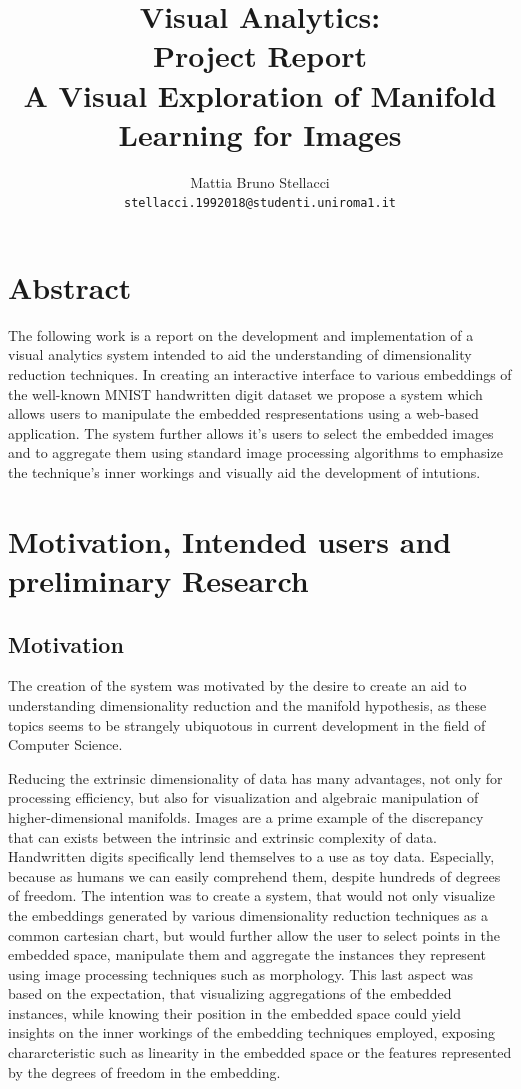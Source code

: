 \documentclass[11pt,a4paper]{article}
\title{Visual Analytics: \\ 
  Project Report \\
  A Visual Exploration of Manifold Learning for Images}
\author{Mattia Bruno Stellacci \\
    \texttt{stellacci.1992018@studenti.uniroma1.it}
  }
\date{}
\begin{document}
  \maketitle


  \section*{Abstract}
  The following work is a report on the development and implementation of a visual analytics system intended to aid the understanding of dimensionality reduction techniques. In creating an interactive interface to various embeddings of the well-known MNIST handwritten digit dataset we propose a system which allows users to manipulate the embedded respresentations using a web-based application. The system further allows it's users to select the embedded images and to aggregate them using standard image processing algorithms to emphasize the technique's inner workings and visually aid the development of intutions.     

  \section{Motivation, Intended users and preliminary Research}
  \subsection {Motivation}
  The creation of the system was motivated by the desire to create an aid to understanding dimensionality reduction and the manifold hypothesis, as these topics seems to be strangely ubiquotous in current development in the field of Computer Science. 

  Reducing the extrinsic dimensionality of data has many advantages, not only for processing efficiency, but also for visualization and algebraic manipulation of higher-dimensional manifolds. 
  Images are a prime example of the discrepancy that can exists between the intrinsic and extrinsic complexity of data. Handwritten digits specifically lend themselves to a use as toy data. Especially, because as humans we can easily comprehend them, despite hundreds of degrees of freedom.
  The intention was to create a system, that would not only visualize the embeddings generated by various dimensionality reduction techniques as a common cartesian chart, but would further allow the user to select points in the embedded space, manipulate them and aggregate the instances they represent using image processing techniques such as morphology. This last aspect was based on the expectation, that visualizing aggregations of the embedded instances, while knowing their position in the embedded space could yield insights on the inner workings of the embedding techniques employed, exposing chararcteristic such as linearity in the embedded space or the features represented by the degrees of freedom in the embedding.
\end{document}
